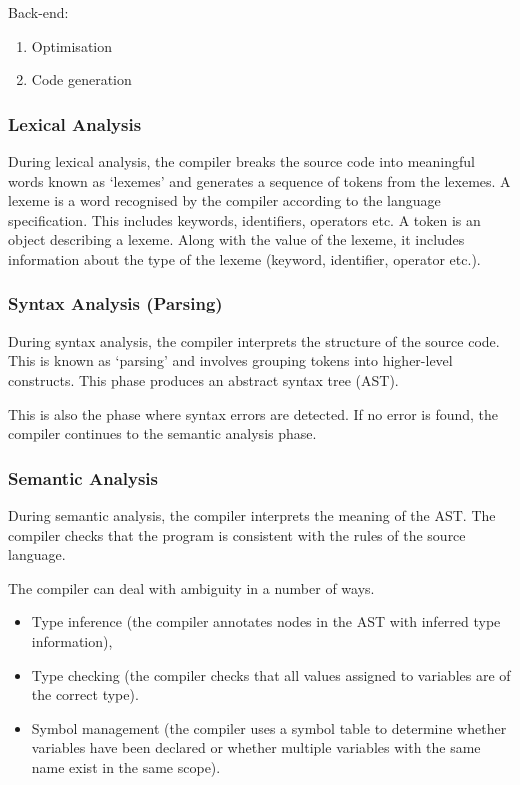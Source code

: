 Back-end:
\begin{enumerate}[resume]
  \item Optimisation
  \item Code generation
\end{enumerate}

\subsubsection{Lexical Analysis}

During lexical analysis, the compiler breaks the source code into meaningful words known as `lexemes' and generates a sequence of tokens from the lexemes.
A lexeme is a word recognised by the compiler according to the language specification.
This includes keywords, identifiers, operators etc.
A token is an object describing a lexeme.
Along with the value of the lexeme, it includes information about the type of the lexeme (keyword, identifier, operator etc.).

\subsubsection{Syntax Analysis (Parsing)}

During syntax analysis, the compiler interprets the structure of the source code.
This is known as `parsing' and involves grouping tokens into higher-level constructs.
This phase produces an abstract syntax tree (AST).

This is also the phase where syntax errors are detected.
If no error is found, the compiler continues to the semantic analysis phase.

\subsubsection{Semantic Analysis}

During semantic analysis, the compiler interprets the meaning of the AST.\@
The compiler checks that the program is consistent with the rules of the source language.

The compiler can deal with ambiguity in a number of ways.

\begin{itemize}
  \item Type inference (the compiler annotates nodes in the AST with inferred type information),
  \item Type checking (the compiler checks that all values assigned to variables are of the correct type).
  \item Symbol management (the compiler uses a symbol table to determine whether variables have been declared or whether multiple variables with the same name exist in the same scope).
\end{itemize}

